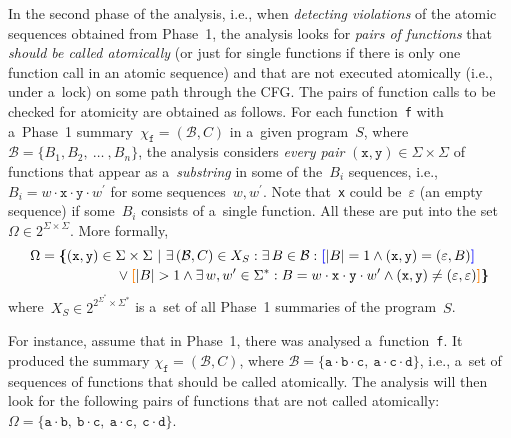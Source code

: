 In the second phase of the analysis, i.e., when \emph{detecting violations} of the atomic sequences obtained from Phase~1, the analysis looks for \emph{pairs of functions} that \emph{should be called atomically} (or just for single functions if there is only one function call in an atomic sequence) and that are not executed atomically (i.e., under a~lock) on some path through the CFG. The pairs of function calls to be checked for atomicity are obtained as follows. For each function~\texttt{f} with a~Phase~1 summary~$ \chi_\mathtt{f} = (\mathcal{B}, C) $ in a~given program~$ S $, where $ \mathcal{B} = \{B_1, B_2,\ \ldots\ , B_n\} $, the analysis considers \emph{every pair} $ (\mathtt{x}, \mathtt{y}) \in \Sigma \times \Sigma $ of functions that appear as a~\emph{substring} in some of the~$ B_i $ sequences, i.e., $ B_i = w \cdot \mathtt{x} \cdot \mathtt{y} \cdot w^\prime $ for some sequences~$ w, w^\prime $. Note that~\texttt{x} could be~$ \varepsilon $ (an empty sequence) if some~$ B_i $ consists of a~single function. All these  are put into the set $ \Omega \in 2^{\Sigma \times \Sigma} $. More formally,
$$
\begin{multlined}
    \Omega = \bb{\{}(\mathtt{x}, \mathtt{y}) \in \Sigma \times \Sigma\ |\ \exists\,(\mathcal{B}, C) \in X_S : \exists\,B \in \mathcal{B} : \bA{[}|B| = 1 \wedge (\mathtt{x}, \mathtt{y}) = (\varepsilon, B)\bA{]} \\
%
    \vee \bB{[}|B| > 1 \wedge \exists\,w, w^\prime \in \Sigma^* : B = w \cdot \mathtt{x} \cdot \mathtt{y} \cdot w^\prime \wedge (\mathtt{x}, \mathtt{y}) \neq (\varepsilon, \varepsilon)%
%
    \bB{]}\bb{\}}
\end{multlined}
$$
where~$ X_S \in 2^{2^{\Sigma^*} \times \Sigma^*} $ is a~set of all Phase~1 summaries of the program~$ S $.

\begin{example}
    For instance, assume that in Phase~1, there was analysed a~function~\texttt{f}. It produced the summary $ \chi_\mathtt{f} = (\mathcal{B}, C) $, where $ \mathcal{B} = \{\mathtt{a} \cdot \mathtt{b} \cdot \mathtt{c},\ \mathtt{a} \cdot \mathtt{c} \cdot \mathtt{d}\} $, i.e., a~set of sequences of functions that should be called atomically. The analysis will then look for the following pairs of functions that are not called atomically: $ \Omega = \{\mathtt{a} \cdot \mathtt{b},\ \mathtt{b} \cdot \mathtt{c},\ \mathtt{a} \cdot \mathtt{c},\ \mathtt{c} \cdot \mathtt{d}\} $.
\end{example}


